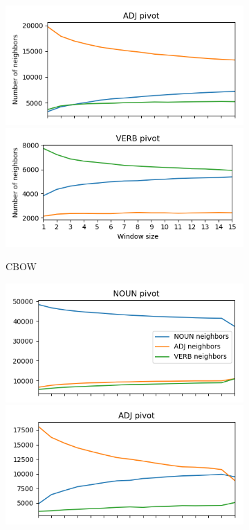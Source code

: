 \documentclass[extrafontsizes,60pt,twocolumn]{memoir}
\begin{document}
\begin{figure}[h]
\begin{subfigure}[c]{.35\columnwidth}
        \includegraphics[width=\columnwidth]{ADJ_nn_100_fasttext_enwiki-20170501-clean_cbow-300d-min500_pos.png}
        \includegraphics[width=\columnwidth]{VERB_nn_100_fasttext_enwiki-20170501-clean_cbow-300d-min500_pos.png}
        \caption{CBOW}
        \end{subfigure}
        \hfill
        \begin{subfigure}[c]{.35\columnwidth}
        \includegraphics[width=\columnwidth]{NOUN_nn_100_fasttext_enwiki-20170501-clean_skipgram-300d-min500_pos.png}
        \includegraphics[width=\columnwidth]{ADJ_nn_100_fasttext_enwiki-20170501-clean_skipgram-300d-min500_pos.png}

\end{subfigure}
\end{figure}
\end{document}
